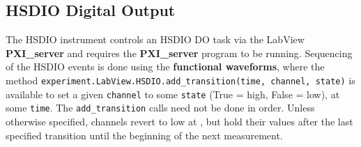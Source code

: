 \documentclass[pdftex,11pt,letterpaper]{article}
\begin{document}
\subsection{HSDIO Digital Output}

The HSDIO instrument controls an HSDIO DO task via the LabView \textbf{PXI\_server} and requires the \textbf{PXI\_server} program to be running.  Sequencing of the HSDIO events is done using the \textbf{functional waveforms}, where the method \texttt{experiment.LabView.HSDIO.add\_transition(time, channel, state)} is available to set a given \texttt{channel} to some \texttt{state} (True = high, False = low), at some \texttt{time}.  The \texttt{add\_transition} calls need not be done in order.  Unless otherwise specified, channels revert to low at , but hold their values after the last specified transition until the beginning of the next measurement.
\end{document}
